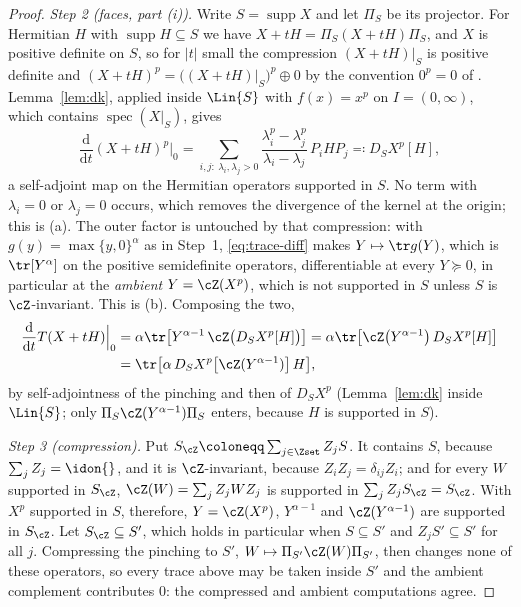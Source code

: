 \begin{proof}
\emph{Step 2 (faces, part (i)).} Write $S=\operatorname{supp}X$ and let
$\Pi_{S}$ be its projector. For Hermitian $H$ with
$\operatorname{supp}H\subseteq S$ we have
$X+tH=\Pi_{S}(X+tH)\Pi_{S}$, and $X$ is positive definite on $S$, so for
$|t|$ small the compression $(X+tH)|_{S}$ is positive definite and
$(X+tH)^{p}=\big((X+tH)|_{S}\big)^{p}\oplus0$ by the convention $0^{p}=0$
of . Lemma~\ref{lem:dk}, applied inside
$\Lin{S}$ with $f(x)=x^{p}$ on $I=(0,\infty)$, which contains
$\operatorname{spec}(X|_{S})$, gives
\begin{equation}\label{eq:face-dpow}
  \frac{\mathrm d}{\mathrm dt}(X+tH)^{p}\Big|_{0}
  =\!\!\sum_{i,j:\ \lambda_i,\lambda_j>0}\!\!
  \frac{\lambda_i^{p}-\lambda_j^{p}}{\lambda_i-\lambda_j}\,P_iHP_j
  \eqqcolon D_{S}X^{p}[H],
\end{equation}
a self-adjoint map on the Hermitian operators supported in $S$. No term
with $\lambda_i=0$ or $\lambda_j=0$ occurs, which removes the divergence
of the kernel at the origin; this is (a). The outer factor is untouched by
that compression: with $g(y)=\max\{y,0\}^{\alpha}$ as in Step~1,
\eqref{eq:trace-diff} makes $Y\mapsto\tr g(Y)$, which is $\tr[Y^{\alpha}]$
on the positive semidefinite operators, differentiable at every
$Y\succeq0$, in particular at the \emph{ambient}
$Y=\cZ(X^{p})$, which is not supported in $S$ unless $S$ is
$\cZ$-invariant. This is (b). Composing the two,
\begin{equation*}
\begin{aligned}
  \frac{\mathrm d}{\mathrm dt}T(X+tH)\Big|_{0}
  &=\alpha\tr\big[Y^{\alpha-1}\,\cZ\big(D_{S}X^{p}[H]\big)\big]
  =\alpha\tr\big[\cZ\big(Y^{\alpha-1}\big)\,D_{S}X^{p}[H]\big]\\
  &=\tr\big[\alpha\,D_{S}X^{p}\big[\cZ(Y^{\alpha-1})\big]\,H\big],
\end{aligned}
\end{equation*}
by self-adjointness of the pinching and then of $D_{S}X^{p}$
(Lemma~\ref{lem:dk} inside $\Lin{S}$; only
$\Pi_{S}\cZ(Y^{\alpha-1})\Pi_{S}$ enters, because $H$ is supported in
$S$).

\emph{Step 3 (compression).} Put $S_{\cZ}\coloneqq\sum_{j\in\Zset}Z_jS$.
It contains $S$, because $\sum_jZ_j=\idon{}$, and it is $\cZ$-invariant,
because $Z_iZ_j=\delta_{ij}Z_i$; and for every $W$ supported in $S_{\cZ}$,
$\cZ(W)=\sum_jZ_jWZ_j$ is supported in $\sum_jZ_jS_{\cZ}=S_{\cZ}$. With
$X^{p}$ supported in $S$, therefore, $Y=\cZ(X^{p})$, $Y^{\alpha-1}$ and
$\cZ(Y^{\alpha-1})$ are supported in $S_{\cZ}$. Let
$S_{\cZ}\subseteq S'$, which holds in particular when $S\subseteq S'$ and
$Z_jS'\subseteq S'$ for all $j$. Compressing the pinching to $S'$,
$W\mapsto\Pi_{S'}\cZ(W)\Pi_{S'}$, then changes none of these operators, so
every trace above may be taken inside $S'$ and the ambient complement
contributes $0$: the compressed and ambient computations agree.


\end{proof}
